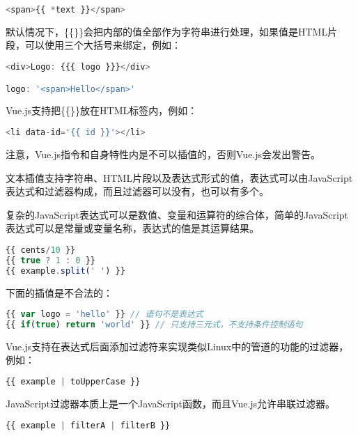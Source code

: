 \begin{lstlisting}[language=JavaScript]
<span>{{ *text }}</span>
\end{lstlisting}

默认情况下，\{\{\}\}会把内部的值全部作为字符串进行处理，如果值是HTML片段，可以使用三个大括号来绑定，例如：


\begin{lstlisting}[language=JavaScript]
<div>Logo: {{{ logo }}}</div>

logo: '<span>Hello</span>'
\end{lstlisting}

Vue.js支持把\{\{\}\}放在HTML标签内，例如：

\begin{lstlisting}[language=JavaScript]
<li data-id='{{ id }}'></li>
\end{lstlisting}


注意，Vue.js指令和自身特性内是不可以插值的，否则Vue.js会发出警告。


文本插值支持字符串、HTML片段以及表达式形式的值，表达式可以由JavaScript表达式和过滤器构成，而且过滤器可以没有，也可以有多个。

复杂的JavaScript表达式可以是数值、变量和运算符的综合体，简单的JavaScript表达式可以是常量或变量名称，表达式的值是其运算结果。



\begin{lstlisting}[language=JavaScript]
{{ cents/10 }}
{{ true ? 1 : 0 }}
{{ example.split(' ') }}
\end{lstlisting}

下面的插值是不合法的：

\begin{lstlisting}[language=JavaScript]
{{ var logo = 'hello' }} // 语句不是表达式
{{ if(true) return 'world' }} // 只支持三元式，不支持条件控制语句
\end{lstlisting}

Vue.js支持在表达式后面添加过滤符来实现类似Linux中的管道的功能的过滤器，例如：


\begin{lstlisting}[language=JavaScript]
{{ example | toUpperCase }}
\end{lstlisting}

JavaScript过滤器本质上是一个JavaScript函数，而且Vue.js允许串联过滤器。

\begin{lstlisting}[language=JavaScript]
{{ example | filterA | filterB }}
\end{lstlisting}

